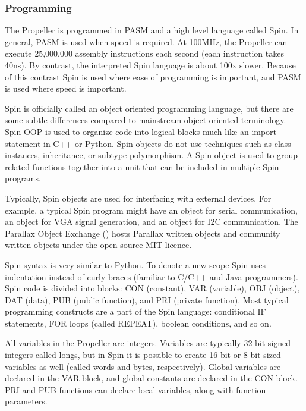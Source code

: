 \documentclass{article}
\numberwithin{equation}{section} %
\begin{document}
\subsubsection{Programming}

The Propeller is programmed in PASM and a high level language called Spin. In general, PASM is used when speed is required. At 100MHz, the Propeller can execute 25,000,000 assembly instructions each second (each instruction takes 40ns). By contrast, the interpreted Spin language is about 100x slower. Because of this contrast Spin is used where ease of programming is important, and PASM is used where speed is important.

Spin is officially called an object oriented programming language, but there are some subtle differences compared to mainstream object oriented terminology. Spin OOP is used to organize code into logical blocks much like an import statement in C++ or Python. Spin objects do not use techniques such as class instances, inheritance, or subtype polymorphism. A Spin object is used to group related functions together into a unit that can be included in multiple Spin programs. 

Typically, Spin objects are used for interfacing with external devices. For example, a typical Spin program might have an object for serial communication, an object for VGA signal generation, and an object for I2C communication. The Parallax Object Exchange (\cite{parallaxobjectexchange}) hosts Parallax written objects and community written objects under the open source MIT licence.

Spin syntax is very similar to Python. To denote a new scope Spin uses indentation instead of curly braces {} (familiar to C/C++ and Java programmers). Spin code is divided into blocks: CON (constant), VAR (variable), OBJ (object), DAT (data), PUB (public function), and PRI (private function). Most typical programming constructs are a part of the Spin language: conditional IF statements, FOR loops (called REPEAT), boolean conditions, and so on.

All variables in the Propeller are integers. Variables are typically 32 bit signed integers called longs, but in Spin it is possible to create 16 bit or 8 bit sized variables as well (called words and bytes, respectively). Global variables are declared in the VAR block, and global constants are declared in the CON block. PRI and PUB functions can declare local variables, along with function parameters. 
\end{document}
